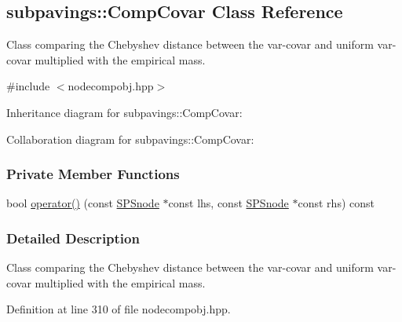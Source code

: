 \hypertarget{classsubpavings_1_1CompCovar}{\subsection{subpavings\-:\-:\-Comp\-Covar \-Class \-Reference}
\label{classsubpavings_1_1CompCovar}
}


\-Class comparing the \-Chebyshev distance between the var-\/covar and uniform var-\/covar multiplied with the empirical mass.  




{\ttfamily \#include $<$nodecompobj.\-hpp$>$}



\-Inheritance diagram for subpavings\-:\-:\-Comp\-Covar\-:


\-Collaboration diagram for subpavings\-:\-:\-Comp\-Covar\-:
\subsubsection*{\-Private \-Member \-Functions}
\begin{DoxyCompactItemize}
\item 
bool \hyperlink{classsubpavings_1_1CompCovar_ad0aa69ba754de16c776d3dcf7e415495}{operator()} (const \hyperlink{classsubpavings_1_1SPSnode}{\-S\-P\-Snode} $\ast$const lhs, const \hyperlink{classsubpavings_1_1SPSnode}{\-S\-P\-Snode} $\ast$const rhs) const 
\end{DoxyCompactItemize}


\subsubsection{\-Detailed \-Description}
\-Class comparing the \-Chebyshev distance between the var-\/covar and uniform var-\/covar multiplied with the empirical mass. 

\-Definition at line 310 of file nodecompobj.\-hpp.




